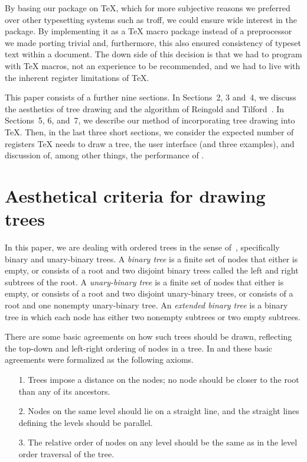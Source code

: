 By basing our package on \TeX{}, which for more subjective
reasons we preferred over other typesetting systems such as
troff, we could ensure wide interest
in the package. By implementing it as a \TeX{} macro package
instead of a preprocessor
we made porting trivial and, furthermore, this also ensured
consistency of typeset text within a document.
The down side of this decision is that we had  to program with
\TeX{} macros, not an experience to be recommended, and we had to live
with the inherent register limitations of \TeX{}.

This paper consists of a further nine  sections. In Sections~2, 3 and~4,
we discuss the aesthetics of tree drawing and the algorithm of
Reingold and Tilford~\cite{TidierTrees}. In Sections~5, 6, and~7, we
describe our method of incorporating tree drawing into \TeX{}. Then,
in the last three short sections, we consider the expected number of
registers \TeX{} needs to draw a tree, the user interface (and three
\TreeTeX{} examples), and discussion of, among other things, the
performance  of \TreeTeX{}.

\section{Aesthetical criteria for drawing trees}

In this paper, we are dealing with ordered
trees in the sense of~\cite{ACP}, specifically binary and unary-binary
trees. A {\em binary tree\/} is a finite set of nodes that either
is empty, or consists of a root and two disjoint binary trees called
the left and right subtrees of the root. A {\em unary-binary tree\/} is
a finite set of nodes that either is empty, or consists of a root and
two disjoint unary-binary trees, or consists of a root and one
nonempty unary-binary tree. An {\em extended binary tree\/} is a binary tree
in which each node has either two nonempty subtrees or two
empty subtrees.

There are some basic agreements on how such trees should be drawn, reflecting
the top-down and left-right ordering of nodes in a tree.
In \cite{TidierTrees} and \cite{TidyTrees} these basic agreements were
formalized as the following axioms.

\begin{enumerate}
\item[1.] Trees impose a distance on the nodes; no node
          should be closer to the root than any of its
          ancestors.
\item[2.] Nodes on the same level should lie on a straight
          line, and the straight lines defining the levels should be
          parallel.
\item[3.] The relative order of nodes on any level should be the same
          as in the level order traversal of the tree.
\end{enumerate}

